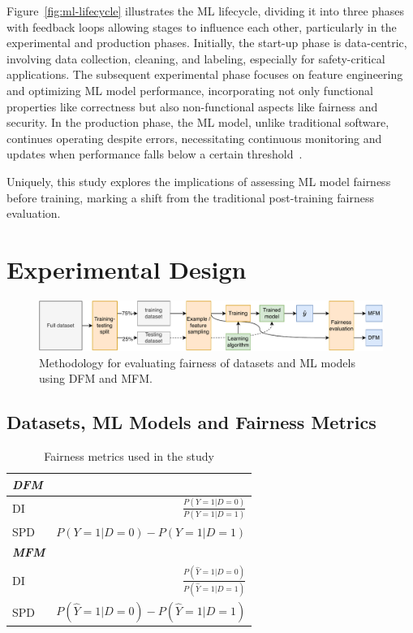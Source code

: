 \documentclass[sigconf,review]{acmart}
\begin{document}
Figure \ref{fig:ml-lifecycle} illustrates the ML lifecycle, dividing
it into three phases with feedback loops allowing stages to influence
each other, particularly in the experimental and production phases.
Initially, the start-up phase is data-centric, involving data
collection, cleaning, and labeling, especially for safety-critical
applications. The subsequent experimental phase focuses on feature
engineering and optimizing ML model performance, incorporating not
only functional properties like correctness but also non-functional
aspects like fairness and security. In the production phase, the ML
model, unlike traditional software, continues operating despite
errors, necessitating continuous monitoring and updates when
performance falls below a certain threshold~\cite{amershi2019software,breck2019data,sambasivan2021everyone,zhang2020machine}.

Uniquely, this study
explores the implications of assessing ML model fairness before
training, marking a shift from the traditional post-training fairness
evaluation.
\section{Experimental Design}\label{sec:method}

\begin{figure}
  \centering
  \includegraphics[width=0.8\linewidth]{method.pdf}
  \caption{Methodology for evaluating fairness of datasets and ML
  models using DFM and MFM.}
  \label{fig:method}
\end{figure}

\subsection{Datasets, ML Models and Fairness Metrics}\label{sec:method-parameters}

\begin{table}
  \centering
  \caption{Fairness metrics used in the study}
  \begin{tabular}{l r}
    \hline
    \textbf{\emph{DFM}}\\
    \hline
    DI & \(\displaystyle \frac{P(Y=1|D=0)}{P(Y=1|D=1)}\)\\
    SPD & \(\displaystyle P(Y=1|D=0)-P(Y=1|D=1)\)\\
    \hline
    \textbf{\emph{MFM}}\\
    \hline
    DI & \(\displaystyle \frac{P(\hat{Y}=1|D=0)}{P(\hat{Y}=1|D=1)}\)\\
    SPD & \(\displaystyle P(\hat{Y}=1|D=0)-P(\hat{Y}=1|D=1)\)\\
    \hline
  \end{tabular}
  \label{tab:fairness-metrics}
\end{table}
\end{document}
